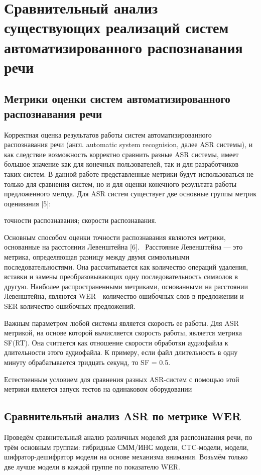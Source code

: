 \documentclass[conference]{IEEEtran}
\begin{document}
    \section{Сравнительный анализ существующих реализаций систем автоматизированного распознавания речи}

    \subsection{Метрики оценки систем автоматизированного распознавания речи}\label{WERSF}

    Корректная оценка результатов работы систем автоматизированного распознавания речи (англ. automatic system recognision, далее ASR системы),
    и как следствие возможность корректно сравнить разные ASR системы, имеет большое значение как для конечных пользователей,
    так и для разработчиков таких систем. В данной работе представленные метрики будут использоваться не только для сравнения систем,
    но и для оценки конечного результата работы предложенного метода.
    Для ASR систем существует две основные группы метрик оценивания [5]:
    \begin{itemize}
         точности распознавания;
         скорости распознавания.
    \end{itemize}

    Основным способом оценки точности распознавания являются метрики, основанные на расстоянии Левенштейна [6]. 
Расстояние Левенштейна — это метрика, определяющая разницу между двумя символьными последовательностями. Она рассчитывается как количество операций удаления, вставки и замены преобразовывающих одну последовательность символов в другую. Наиболее распространенными метриками, основанными на расстоянии Левенштейна, являются WER - количество ошибочных слов в предложении и SER количество ошибочных предложений.

Важным параметром любой системы является скорость ее работы. Для ASR метрикой, на основе которой вычисляется скорость работы, является метрика SF(RT). Она считается как отношение скорости обработки аудиофайла к длительности этого аудиофайла. К примеру, если файл длительность в одну минуту обрабатывается тридцать секунд, то SF = 0.5.

Естественным условием для сравнения разных ASR-систем с помощью этой метрики является запуск тестов на одинаковом оборудовании

\subsection{Сравнительный анализ ASR по метрике WER}\label{AA}
Проведём сравнительный анализ различных моделей для распознавания речи, по трём основным группам: гибридные СММ/ИНС модели, CTC-модели, модели, шифратор-дешифратор модели на основе механизма внимания. Возьмём только две лучше модели в каждой группе по показателю WER.
\end{document}
